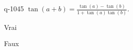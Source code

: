 \begin{truefalse}{q-1045}
$\tan(a+b)=\frac{\tan(a) - \tan(b)}{1+\tan(a)\tan(b)}$.
\item Vrai
\item* Faux
\end{truefalse}

